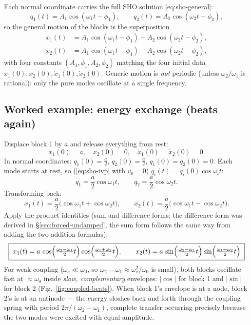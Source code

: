 \documentclass[11pt]{article}
\theoremstyle{plain}
\theoremstyle{definition}
\theoremstyle{remark}
\begin{document}
Each normal coordinate carries the full SHO solution
\eqref{eq:sho-general}:
\begin{equation}
  q_1(t) = A_1 \cos(\omega_1 t - \phi_1),
  \qquad
  q_2(t) = A_2\cos(\omega_2 t - \phi_2),
\end{equation}
so the general motion of the blocks is the superposition
\begin{equation}
  \boxed{\;
  \begin{aligned}
  x_1(t) &= A_1\cos(\omega_1 t - \phi_1) + A_2 \cos(\omega_2 t - \phi_2),\\
  x_2(t) &= A_1\cos(\omega_1 t - \phi_1) - A_2 \cos(\omega_2 t - \phi_2),
  \end{aligned}
  \;}
\end{equation}
with four constants $(A_1,\phi_1,A_2,\phi_2)$ matching the four initial data
$x_1(0), x_2(0), \dot x_1(0), \dot x_2(0)$. Generic motion is \emph{not}
periodic (unless $\omega_2/\omega_1$ is rational): only the pure modes
oscillate at a single frequency.

\subsection{Worked example: energy exchange (beats again)}
\label{sec:coupled-beats}

Displace block 1 by $a$ and release everything from rest:
\begin{equation}
  x_1(0) = a,\quad x_2(0) = 0,\quad \dot x_1(0)=\dot x_2(0) = 0 .
\end{equation}
In normal coordinates: $q_1(0) = \tfrac a2$, $q_2(0) = \tfrac a2$,
$\dot q_1(0) = \dot q_2(0) = 0$. Each mode starts at rest, so
(\eqref{eq:sho-ivp} with $v_0=0$) $q_i(t) = q_i(0)\cos\omega_i t$:
\begin{equation}
  q_1 = \frac a2 \cos\omega_1 t,
  \qquad
  q_2 = \frac a2 \cos\omega_2 t .
\end{equation}
Transforming back:
\begin{equation}
  x_1(t) = \frac a2\bigl(\cos\omega_1 t + \cos\omega_2 t\bigr),
  \qquad
  x_2(t) = \frac a2\bigl(\cos\omega_1 t - \cos\omega_2 t\bigr).
\end{equation}
Apply the product identities (sum and difference forms; the difference form
was derived in \S\ref{sec:forced-undamped}, the sum form follows the same
way from adding the two addition formulas):
\begin{equation}
  \boxed{\;
  x_1(t) = a\,\cos\Bigl(\tfrac{\omega_2-\omega_1}{2}t\Bigr)
             \cos\Bigl(\tfrac{\omega_1+\omega_2}{2}t\Bigr),
  \qquad
  x_2(t) = a\,\sin\Bigl(\tfrac{\omega_2-\omega_1}{2}t\Bigr)
             \sin\Bigl(\tfrac{\omega_1+\omega_2}{2}t\Bigr)
  \;}
\end{equation}
For weak coupling ($\omega_c\ll\omega_0$, so
$\omega_2 - \omega_1 \approx \omega_c^2/\omega_0$ is small), both blocks
oscillate fast at $\approx\omega_0$ inside \emph{slow, complementary}
envelopes: $|\cos|$ for block 1 and $|\sin|$ for block 2
(Fig.~\ref{fig:coupled-beats}). When block 1's envelope is at a node, block
2's is at an antinode --- the energy sloshes back and forth through the
coupling spring with period $2\pi/(\omega_2-\omega_1)$, complete transfer
occurring precisely because the two modes were excited with equal amplitude.
\end{document}
